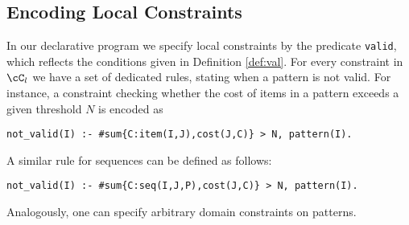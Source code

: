 \subsection{Encoding Local Constraints} 

In our declarative program we specify local constraints by the predicate \texttt{valid}, which reflects the conditions given in Definition \ref{def:val}. For every constraint in $\cC_l$ we have a set of dedicated rules, stating when a pattern is not valid. 
For instance, a constraint checking whether the cost of items in a pattern exceeds a given threshold $N$ is encoded as %

\small{\begin{center}
\texttt{not\_valid(I) :- \#sum\{C:item(I,J),cost(J,C)\} > N, pattern(I).}
\end{center}}

\normalsize{A similar rule for sequences can be defined as follows: }%

\small{\begin{center}
\texttt{not\_valid(I) :- \#sum\{C:seq(I,J,P),cost(J,C)\} > N, pattern(I).}
\end{center}}

 
\normalsize{Analogously, one can specify arbitrary domain constraints on patterns. }

